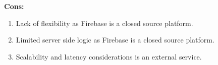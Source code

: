 \documentclass[11pt,a4paper]{article}
\begin{document}
\textbf{Cons:}
\begin{enumerate}[label*=\arabic*.]
	\item[\textbullet] Lack of flexibility as Firebase is a closed source platform.
	\item[\textbullet] Limited server side logic as Firebase is a closed source platform.
	\item[\textbullet] Scalability and latency considerations is an external service.
\end{enumerate}
\end{document}
